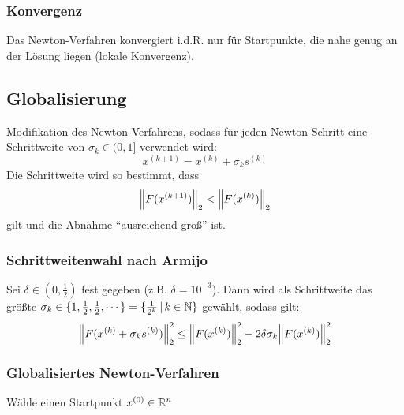 			\subsubsection{Konvergenz}
				Das Newton-Verfahren konvergiert i.d.R. nur für Startpunkte, die nahe genug an der Lösung liegen (lokale Konvergenz).

        \subsection{Globalisierung}
	        Modifikation des Newton-Verfahrens, sodass für jeden Newton-Schritt eine Schrittweite von \( \sigma_k \in (0, 1] \) verwendet wird:
	        \begin{equation*}
		        x^{(k + 1)} = x^{(k)} + \sigma_k s^{(k)}
	        \end{equation*}
	        Die Schrittweite wird so bestimmt, dass \[ \norm{F(x^{(k+1)})}_2 < \norm{F(x^{(k)})}_2 \] gilt und die Abnahme \enquote{ausreichend groß} ist.

            \subsubsection{Schrittweitenwahl nach Armijo}
                Sei \( \delta \in (0, \frac{1}{2}) \) fest gegeben (z.B. \( \delta = 10^{-3} \)). Dann wird als Schrittweite das größte \( \sigma_k \in \{ 1, \frac{1}{2}, \frac{1}{2}, \cdots \} = \{ \frac{1}{2^k} \,\vert\, k \in \mathbb{N} \} \) gewählt, sodass gilt:
                \begin{equation*}
	                \norm{F(x^{(k)} + \sigma_k s^{(k)})}_2^2 \leq \norm{F(x^{(k)})}_2^2 - 2 \delta \sigma_k \norm{F(x^{(k)})}_2^2
                \end{equation*}

            \subsubsection{Globalisiertes Newton-Verfahren}
				\begin{algorithm}[H]
					\SetAlgoLined
					Wähle einen Startpunkt \( x^{(0)} \in \mathbb{R}^n \) \\
				\end{algorithm}

